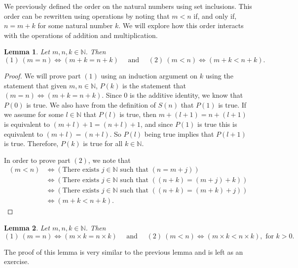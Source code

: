 \documentclass[
]{book}
\newtheorem{lemma}{Lemma}[chapter]
\theoremstyle{definition}
\theoremstyle{definition}
\theoremstyle{definition}
\theoremstyle{definition}
\theoremstyle{remark}
\begin{document}
We previously defined the order on the natural numbers using set inclusions. This order can be rewritten using operations by noting that \(m<n\) if, and only if, \(n=m+k\) for some natural number \(k\). We will explore how this order interacts with the operations of addition and multiplication.

\begin{lemma}
\protect\hypertarget{lem:order-addition-naturals}{}\label{lem:order-addition-naturals}Let \(m,n,k\in \mathbb{N}\). Then \[ (1) \: (m=n) \Leftrightarrow (m+k=n+k) \quad \mbox{ and } \quad (2) \: (m<n) \Leftrightarrow (m+k<n+k).\]
\end{lemma}

\begin{proof}
We will prove part \((1)\) using an induction argument on \(k\) using the statement that given \(m,n\in \mathbb{N}\), \(P(k)\) is the statement that \((m=n) \Leftrightarrow (m+k=n+k)\). Since \(0\) is the additive identity, we know that \(P(0)\) is true. We also have from the definition of \(S(n)\) that \(P(1)\) is true. If we assume for some \(l\in \mathbb{N}\) that \(P(l)\) is true, then \(m+(l+1) = n+(l+1)\) is equivalent to \((m+l)+1 = (n+l)+1\), and since \(P(1)\) is true this is equivalent to \((m+l)=(n+l)\). So \(P(l)\) being true implies that \(P(l+1)\) is true. Therefore, \(P(k)\) is true for all \(k\in \mathbb{N}\).

In order to prove part \((2)\), we note that
\begin{align*}
    (m<n) &\Leftrightarrow (\mbox{There exists } j\in \mathbb{N} \mbox{ such that } (n=m+j)) \\
    &\Leftrightarrow (\mbox{There exists } j\in \mathbb{N} \mbox{ such that } ((n+k)=(m+j)+k)) \\
    &\Leftrightarrow (\mbox{There exists } j\in \mathbb{N} \mbox{ such that } ((n+k)=(m+k)+j)) \\
    &\Leftrightarrow (m+k<n+k).        
\end{align*}
\end{proof}

\begin{lemma}
\protect\hypertarget{lem:order-multiplication-naturals}{}\label{lem:order-multiplication-naturals}Let \(m,n,k\in \mathbb{N}\). Then \[ (1) \: (m=n) \Leftrightarrow (m\times k=n\times k) \quad \mbox{ and } \quad (2) \: (m<n) \Leftrightarrow (m\times k<n\times k), \mbox{ for } k>0.\]
\end{lemma}

The proof of this lemma is very similar to the previous lemma and is left as an exercise.
\end{document}
